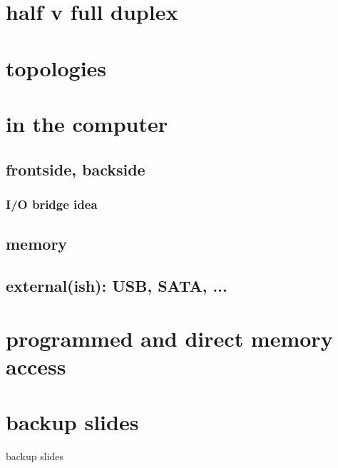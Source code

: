 \date{}
\title{}
\date{}
\usepackage{multirow}

\begin{frame}
    \titlepage
\end{frame}

\section{half v full duplex}



\section{topologies}




\section{in the computer}



\subsection{frontside, backside}

\subsubsection{I/O bridge idea}

\subsection{memory}

\subsection{external(ish): USB, SATA, ...}

\section{programmed and direct memory access}


\section{backup slides}
\begin{frame}{backup slides}
\end{frame}


